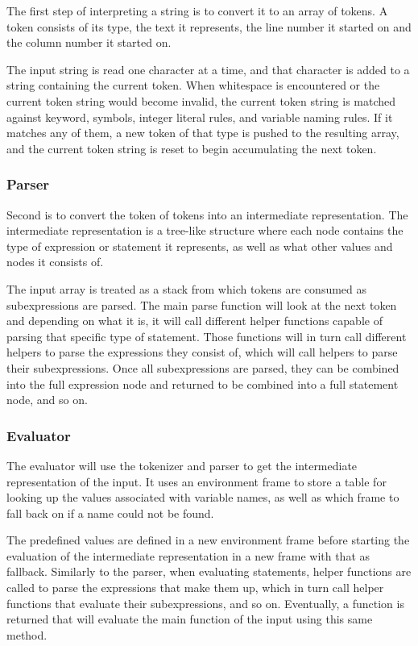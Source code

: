 The first step of interpreting a string is to convert it to an array of tokens. A token consists of its type, the text it represents, the line number it started on and the column number it started on.

The input string is read one character at a time, and that character is added to a string containing the current token. When whitespace is encountered or the current token string would become invalid, the current token string is matched against keyword, symbols, integer literal rules, and variable naming rules. If it matches any of them, a new token of that type is pushed to the resulting array, and the current token string is reset to begin accumulating the next token.

\subsubsection{Parser}

Second is to convert the token of tokens into an intermediate representation. The intermediate representation is a tree-like structure where each node contains the type of expression or statement it represents, as well as what other values and nodes it consists of.

The input array is treated as a stack from which tokens are consumed as subexpressions are parsed. The main parse function will look at the next token and depending on what it is, it will call different helper functions capable of parsing that specific type of statement. Those functions will in turn call different helpers to parse the expressions they consist of, which will call helpers to parse their subexpressions. Once all subexpressions are parsed, they can be combined into the full expression node and returned to be combined into a full statement node, and so on.

\subsubsection{Evaluator}

The evaluator will use the tokenizer and parser to get the intermediate representation of the input. It uses an environment frame to store a table for looking up the values associated with variable names, as well as which frame to fall back on if a name could not be found.

The predefined values are defined in a new environment frame before starting the evaluation of the intermediate representation in a new frame with that as fallback. Similarly to the parser, when evaluating statements, helper functions are called to parse the expressions that make them up, which in turn call helper functions that evaluate their subexpressions, and so on. Eventually, a function is returned that will evaluate the main function of the input using this same method.

